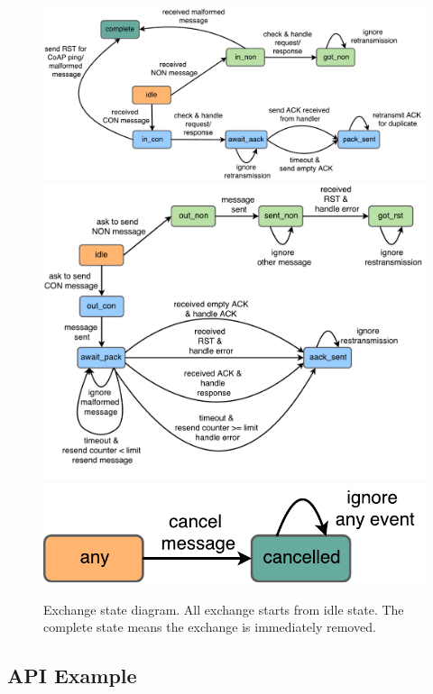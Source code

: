 \begin{figure}[!htbp]
\centering
\includegraphics[scale = 0.55]{exchange_state_in}
\includegraphics[scale = 0.55]{exchange_state_out}
\includegraphics[scale = 0.55]{exchange_state_cancel}
\caption[Exchange state diagram]{Exchange state diagram. All exchange starts from idle state. The complete state means the exchange is immediately removed.}
\label{fig:exchange_state_transition}
\end{figure}

\subsection{API Example}\label{api_example}

